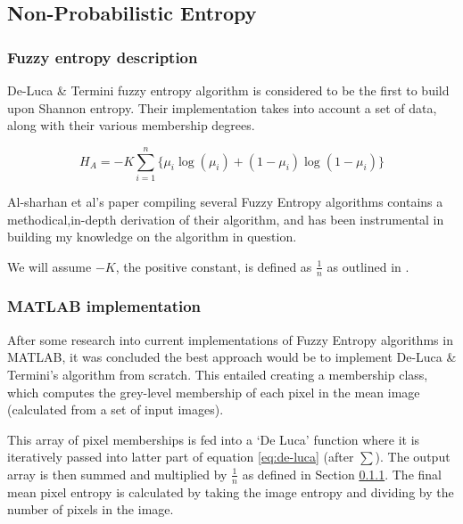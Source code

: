 \subsection{Non-Probabilistic Entropy}
\label{ssec:non-prob-sec}

\subsubsection{Fuzzy entropy description}
\label{sssec:desc}

De-Luca \& Termini fuzzy entropy algorithm \cite{DeLuca_Termini_1972} is considered to be the first to build upon Shannon entropy. Their implementation takes into account a set of data, along with their various membership degrees.


\begin{equation}
  \label{eq:de-luca}
  H_A = -K \displaystyle\sum_{i=1}^{n}{\{\mu_i\log(\mu_i) + (1 - \mu_i)\log(1 - \mu_i)\}}
\end{equation}

Al-sharhan et al's paper compiling several Fuzzy Entropy algorithms \cite{Al-Sharhan_Karray_Gueaieb_Basir_2001} contains a methodical,in-depth derivation of their algorithm, and has been instrumental in building my knowledge on the algorithm in question.

We will assume $-K$, the positive constant, is defined as $\frac{1}{n}$ as outlined in \cite{DeLuca_Termini_1972}.

\subsubsection{MATLAB implementation}

After some research into current implementations of Fuzzy Entropy algorithms in MATLAB, it was concluded the best approach would be to implement De-Luca \& Termini's algorithm from scratch. This entailed creating a membership class, which computes the grey-level membership of each pixel in the mean image (calculated from a set of input images).

This array of pixel memberships is fed into a `De Luca' function where it is iteratively passed into latter part of equation \ref{eq:de-luca} (after $\displaystyle\sum$). The output array is then summed and multiplied by $\frac{1}{n}$ as defined in Section \ref{sssec:desc}. The final mean pixel entropy is calculated by taking the image entropy and dividing by the number of pixels in the image.

